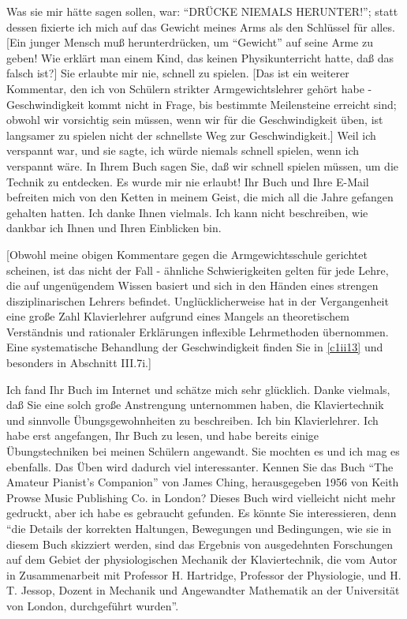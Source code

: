 Was sie mir hätte sagen sollen, war: \enquote{DRÜCKE NIEMALS HERUNTER!}; statt dessen fixierte ich mich auf das Gewicht meines Arms als den Schlüssel für alles.
[Ein junger Mensch muß herunterdrücken, um \enquote{Gewicht} auf seine Arme zu geben!
Wie erklärt man einem Kind, das keinen Physikunterricht hatte, daß das falsch ist?]
Sie erlaubte mir nie, schnell zu spielen.
[Das ist ein weiterer Kommentar, den ich von Schülern strikter Armgewichtslehrer gehört habe - Geschwindigkeit kommt nicht in Frage, bis bestimmte Meilensteine erreicht sind; obwohl wir vorsichtig sein müssen, wenn wir für die Geschwindigkeit üben, ist langsamer zu spielen nicht der schnellste Weg zur Geschwindigkeit.]
Weil ich verspannt war, und sie sagte, ich würde niemals schnell spielen, wenn ich verspannt wäre.
In Ihrem Buch sagen Sie, daß wir schnell spielen müssen, um die Technik zu entdecken.
Es wurde mir nie erlaubt!
Ihr Buch und Ihre E-Mail befreiten mich von den Ketten in meinem Geist, die mich all die Jahre gefangen gehalten hatten.
Ich danke Ihnen vielmals.
Ich kann nicht beschreiben, wie dankbar ich Ihnen und Ihren Einblicken bin.

[Obwohl meine obigen Kommentare gegen die Armgewichtsschule gerichtet scheinen, ist das nicht der Fall - ähnliche Schwierigkeiten gelten für jede Lehre, die auf ungenügendem Wissen basiert und sich in den Händen eines strengen disziplinarischen Lehrers befindet.
Unglücklicherweise hat in der Vergangenheit eine große Zahl Klavierlehrer aufgrund eines Mangels an theoretischem Verständnis und rationaler Erklärungen inflexible Lehrmethoden übernommen.
Eine systematische Behandlung der Geschwindigkeit finden Sie in \hyperref[c1ii13]{\autoref{c1ii13}} und besonders in Abschnitt III.7i.]


\item \label{testimonials07}
Ich fand Ihr Buch im Internet und schätze mich sehr glücklich.
Danke vielmals, daß Sie eine solch große Anstrengung unternommen haben, die Klaviertechnik und sinnvolle Übungsgewohnheiten zu beschreiben.
Ich bin Klavierlehrer.
Ich habe erst angefangen, Ihr Buch zu lesen, und habe bereits einige Übungstechniken bei meinen Schülern angewandt.
Sie mochten es und ich mag es ebenfalls.
Das Üben wird dadurch viel interessanter.
Kennen Sie das Buch \enquote{The Amateur Pianist's Companion} von James Ching, herausgegeben 1956 von Keith Prowse Music Publishing Co. in London?
Dieses Buch wird vielleicht nicht mehr gedruckt, aber ich habe es gebraucht gefunden.
Es könnte Sie interessieren, denn \enquote{die Details der korrekten Haltungen, Bewegungen und Bedingungen, wie sie in diesem Buch skizziert werden, sind das Ergebnis von ausgedehnten Forschungen auf dem Gebiet der physiologischen Mechanik der Klaviertechnik, die vom Autor in Zusammenarbeit mit Professor H. Hartridge, Professor der Physiologie, und H. T. Jessop, Dozent in Mechanik und Angewandter Mathematik an der Universität von London, durchgeführt wurden}.


